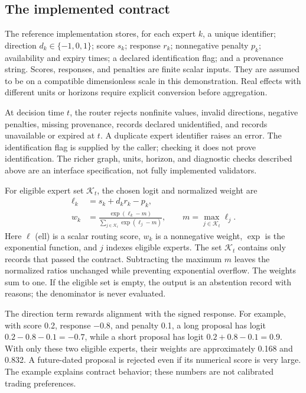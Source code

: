 \subsection{The implemented contract}
The reference implementation stores, for each expert $k$, a unique identifier; direction $d_k\in\{-1,0,1\}$; score $s_k$; response $r_k$; nonnegative penalty $p_k$; availability and expiry times; a declared identification flag; and a provenance string. Scores, responses, and penalties are finite scalar inputs. They are assumed to be on a compatible dimensionless scale in this demonstration. Real effects with different units or horizons require explicit conversion before aggregation.

At decision time $t$, the router rejects nonfinite values, invalid directions, negative penalties, missing provenance, records declared unidentified, and records unavailable or expired at $t$. A duplicate expert identifier raises an error. The identification flag is supplied by the caller; checking it does not prove identification. The richer graph, units, horizon, and diagnostic checks described above are an interface specification, not fully implemented validators.

For eligible expert set $\mathcal{K}_t$, the chosen logit and normalized weight are
\begin{align}
 \ell_k&=s_k+d_kr_k-p_k,\\
 w_k&=\frac{\exp(\ell_k-m)}{\sum_{j\in\mathcal{K}_t}\exp(\ell_j-m)},\qquad
 m=\max_{j\in\mathcal{K}_t}\ell_j.
\end{align}
Here $\ell$ (ell) is a scalar routing score, $w_k$ is a nonnegative weight, $\exp$ is the exponential function, and $j$ indexes eligible experts. The set $\mathcal{K}_t$ contains only records that passed the contract. Subtracting the maximum $m$ leaves the normalized ratios unchanged while preventing exponential overflow. The weights sum to one. If the eligible set is empty, the output is an abstention record with reasons; the denominator is never evaluated.

The direction term rewards alignment with the signed response. For example, with score 0.2, response $-0.8$, and penalty 0.1, a long proposal has logit $0.2-0.8-0.1=-0.7$, while a short proposal has logit $0.2+0.8-0.1=0.9$. With only these two eligible experts, their weights are approximately 0.168 and 0.832. A future-dated proposal is rejected even if its numerical score is very large. The example explains contract behavior; these numbers are not calibrated trading preferences.

